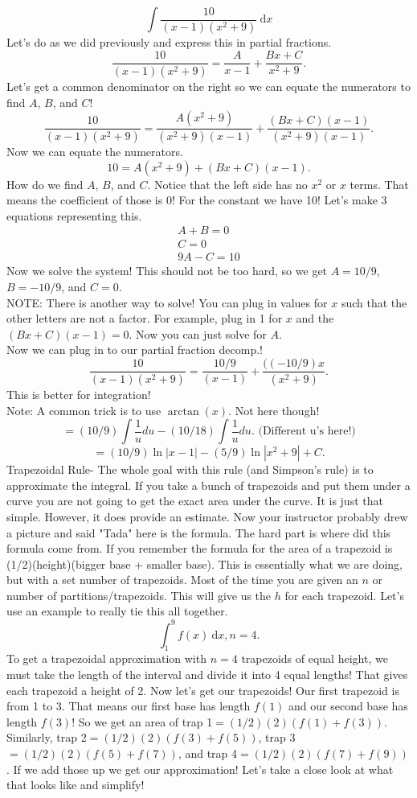 \documentclass[10pt]{article}
\newcommand{\dx}{\:\mathrm{d}x}
\theoremstyle{Theorem}
\theoremstyle{definition}
\theoremstyle{remark}
\theoremstyle{custom}
\begin{document}
$$\int \dfrac{10}{(x-1)(x^2+9)}\dx$$
Let's do as we did previously and express this in partial fractions.
 $$\dfrac{10}{(x-1)(x^2+9)}=\dfrac{A}{x-1}+\dfrac{Bx+C}{x^2+9}.$$
 Let's get a common denominator on the right so we can equate the numerators to find $A$, $B$, and $C$!
 $$\dfrac{10}{(x-1)(x^2+9)}=\dfrac{A(x^2+9)}{(x^2+9)(x-1)}+\dfrac{(Bx+C)(x-1)}{(x^2+9)(x-1)}.$$
 Now we can equate the numerators. 
 $$10=A(x^2+9)+(Bx+C)(x-1).$$
 How do we find $A$, $B$, and $C$. Notice that the left side has no $x^2$ or $x$ terms. That means the coefficient of those is 0! For the constant we have 10! Let's make 3 equations representing this.
 \begin{eqnarray*}
 A+B=0\\
 C=0\\
 9A-C=10
 \end{eqnarray*}
 Now we solve the system! This should not be too hard, so we get $A=10/9$, $B=-10/9$, and $C=0$.\\
 NOTE: There is another way to solve! You can plug in values for $x$ such that the other letters are not a factor. For example, plug in 1 for $x$ and the $(Bx+C)(x-1)=0$. Now you can just solve for $A$.\\
 Now we can plug in to our partial fraction decomp.!
 $$\dfrac{10}{(x-1)(x^2+9)}=\dfrac{10/9}{(x-1)}+\dfrac{((-10/9)x}{(x^2+9)}.$$
This is better for integration!\\
Note: A common trick is to use $\arctan(x)$. Not here though!
$$=(10/9)\int \dfrac{1}{u}du-(10/18)\int \dfrac{1}{u}du.\text{ (Different u's here!)}$$
$$=(10/9)\ln|x-1|-(5/9)\ln|x^2+9|+C.$$
\newpage
Trapezoidal Rule- The whole goal with this rule (and Simpson's rule) is to approximate the integral. If you take a bunch of trapezoids and put them under a curve you are not going to get the exact area under the curve. It is just that simple. However, it does provide an estimate. Now your instructor probably drew a picture and said "Tada" here is the formula. The hard part is where did this formula come from. If you remember the formula for the area of a trapezoid is (1/2)(height)(bigger base + smaller base). This is essentially what we are doing, but with a set number of trapezoids. Most of the time you are given an $n$ or number of partitions/trapezoids. This will give us the $h$ for each trapezoid. Let's use an example to really tie this all together.
$$\int_1^9 f(x) \dx, n=4.$$
To get a trapezoidal approximation with $n=4$ trapezoids of equal height, we must take the length of the interval and divide it into 4 equal lengths! That gives each trapezoid a height of 2.  Now let's get our trapezoids! Our first trapezoid is from 1 to 3. That means our first base has length $f(1)$ and our second base has length $f(3)$! So we get an area of trap 1$=(1/2)(2)(f(1)+f(3))$. Similarly, trap 2$=(1/2)(2)(f(3)+f(5))$, trap 3$=(1/2)(2)(f(5)+f(7))$, and trap 4$=(1/2)(2)(f(7)+f(9))$. If we add those up we get our approximation! Let's take a close look at what that looks like and simplify!
\end{document}
